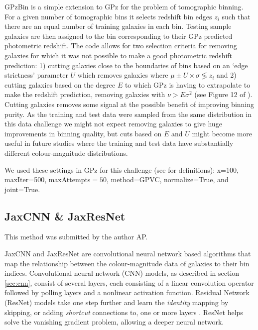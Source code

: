 \documentclass[twocolumn,twocolappendix]{aastex63}
\begin{document}
GPzBin is a simple extension to GPz for the problem of tomographic binning. For
a given number of tomographic bins it selects redshift bin edges $z_{i}$ such
that there are an equal number of training galaxies in each bin. Testing sample
galaxies are then assigned to the bin corresponding to their GPz predicted
photometric redshift. The code allows for two selection criteria for removing
galaxies for which it was not possible to make a good photometric redshift
prediction: 1) cutting galaxies close to the boundaries of bins based on an
`edge strictness' parameter $U$ which removes galaxies where $\mu\pm U \times
\sigma \lessgtr z_i$ and 2) cutting galaxies based on the degree $E$ to which
GPz is having to extrapolate to make the redshift prediction, removing galaxies
with $\nu>E\sigma^2$ (see Figure 12 of \citealp{Hatfield2020}). Cutting galaxies
removes some signal at the possible benefit of improving binning purity. As the
training and test data were sampled from the same distribution in this data
challenge we might not expect removing galaxies to give huge improvements in
binning quality, but cuts based on $E$ and $U$ might become more useful in
future studies where the training and test data have substantially different
colour-magnitude distributions.

We used these settings in GPz for this challenge (see
\citealp{Almosallam2016a,Almosallam2016b} for definitions): x=100, maxIter=500, 
maxAttempts$=50$, method=GPVC, normalize=True, and joint=True.



\subsection{{\sc JaxCNN \& JaxResNet} }
 
This method was submitted by the author AP.
 
JaxCNN and JaxResNet are convolutional neural network based algorithms that
map the relationship between the colour-magnitude data of galaxies to their bin
indices. Convolutional neural network (CNN) models, as described in section
\ref{sec:cnn}, consist of several layers, each consisting of a linear
convolution operator followed by polling layers and a nonlinear activation
function. Residual Network (ResNet) models take one step further and learn the
\textit{identity} mapping by skipping, or adding \textit{shortcut} connections
to, one or more layers \citep{resnet}. ResNet helps solve the vanishing gradient
problem, allowing a deeper neural network.
 
\end{document}
